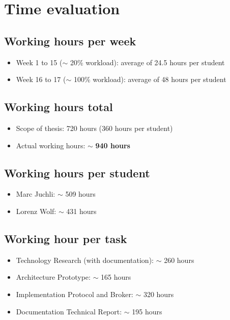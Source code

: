 \section*{Time evaluation}

\subsection*{Working hours per week}
\begin{itemize}
    \item Week 1 to 15 ($\sim$ 20\% workload): average of 24.5 hours per student
    \item Week 16 to 17 ($\sim$ 100\% workload): average of 48 hours per student
\end{itemize}

\subsection*{Working hours total}
\begin{itemize}
    \item Scope of thesis: 720 hours (360 hours per student)
    \item Actual working hours: $\sim$ \textbf{940 hours}
\end{itemize}

\subsection*{Working hours per student}
\begin{itemize}
    \item Marc Juchli: $\sim$ 509 hours 
    \item Lorenz Wolf: $\sim$ 431 hours
\end{itemize}

\subsection*{Working hour per task}
\begin{itemize}
    \item Technology Research (with documentation): $\sim$  260 hours
    \item Architecture Prototype: $\sim$ 165 hours
    \item Implementation Protocol and Broker: $\sim$ 320 hours 
    \item Documentation Technical Report: $\sim$ 195 hours 
\end{itemize}

